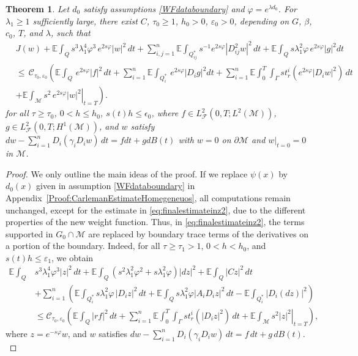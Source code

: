 \documentclass[11pt,oneside,leqno]{amsart}
\numberwithin{equation}{section}
\numberwithin{equation}{section}
\newcommand{\E}{\mathbb{E}}
\newtheorem{theorem}{Theorem}[section]
\begin{document}
{\begin{theorem}\label{theo:CarlemanDataboundary}
Let $d_0$ satisfy assumptions \ref{WFdataboundary} and $\varphi=e^{\lambda d_0}$. For $\lambda_1\geq 1$ sufficiently large, there exist $C$, $\tau_{0}\geq 1$, $h_{0}>0$, $\varepsilon_0 >0$, depending on $G$, $\beta$, $c_{0}$, $T$, and $\lambda$, such that 
\begin{equation}\label{eq:firstCarleman}
\begin{split}
&J(w)+\E\int_{Q}s^{3}\lambda^{4}_{1}\varphi^{3}\,e^{2s\varphi}|w|^{2}\,dt+\sum_{i,j=1}^{n}\E\int_{Q_{ij}^{\ast}}s^{-1}e^{2s\varphi}|D_{ij}^2w|^2\, dt+\E\int_{Q}s\lambda_{1}^2\varphi\,e^{2s\varphi}|g|^2dt\\
&\leq\,\mathcal{C}_{\tau_{0},\varepsilon_0}\left(\E\int_{Q}\,e^{2s\varphi}|f|^2\,dt+\sum_{i=1}^{n}\E\int_{Q_i^{\ast}}\,e^{2s\varphi}|D_{i}g|^2dt+\sum_{i=1}^{n}\E\int_0^T\int_{\Gamma}st_{r}^{i}(e^{2s\varphi}|D_iw|^2)\,dt\right.\\
&\left.+\left.\E\int_{\mathcal{M}}s^2\,e^{2s\varphi}|w|^2\right|_{t=T}\right).
\end{split}
\end{equation}
for all $\tau\geq \tau_0$, $0<h\leq h_0$, $s(t)h\leq \epsilon_0$, where $f\in L^{2}_{\mathcal{F}}(0,T;L^2(\mathcal{M}))$, $g\in L^{2}_{\mathcal{F}}(0,T;H^1(\mathcal{M}))$, and $w$ satisfy $\displaystyle dw-\sum_{i=1}^{n} D_i(\gamma_i D_{i}w)\,dt=fdt+gdB(t)$ with $w=0$ on $\partial \mathcal{M}$ and $w|_{t=0}=0$ in $\mathcal{M}$.
\end{theorem}
\begin{proof}
   We only outline the main ideas of the proof. If we replace $ \psi(x) $ by $ d_0(x)$ given in assumption \eqref{WFdataboundary} in Appendix~\ref{Proof:CarlemanEstimateHomegeneuos}, all computations remain unchanged, except for the estimate in \eqref{eq:finalestimateinz2}, due to the different properties of the new weight function. Thus, in \eqref{eq:finalestimateinz2}, the terms supported in $ G_0 \cap \mathcal{M} $ are replaced by boundary trace terms of the derivatives on a portion of the boundary. Indeed, for all $\tau\geq \tau_{1}>1$, $0<h<h_0$, and $s(t)h\le\varepsilon_1$, we obtain
\begin{equation}\label{eq1:carlemandatainterior}
\begin{aligned}
    \E\int_{Q}& s^{3}\lambda^{4}_{1}\varphi^{3}|z|^{2}\,dt+\E\int_{Q}(s^2\lambda_{1}^2\varphi^2+s\lambda_{1}^2\varphi)|dz|^2+\E\int_{Q}|Cz|^2\,dt\\
&+\sum_{i=1}^{n}\left(\E\int_{Q_{i}^{\ast}}s\lambda^{2}_{1}\varphi\,|D_{i}z|^{2}\,dt+\E\int_{Q} s\lambda_{1}^2\varphi|A_iD_iz|^2\,dt-\E\int_{Q_i^{\ast}}|D_i(dz)|^2\right)\\
&\leq\mathcal{C}_{\tau_{0},\varepsilon_0}\left(\E\int_{Q}|rf|^2\,dt+\sum_{i=1}^{n}\E\int_{0}^{T}\int_{\Gamma}st_{r}^{i}(|D_iz|^2)\,dt+\left.\E\int_{\mathcal{M}}s^2|z|^2\right|_{t=T}\right),
\end{aligned}
\end{equation}
where $z=e^{-s\varphi}w$, and $w$ satisfies $\displaystyle
dw-\sum_{i=1}^{n}D_i(\gamma_iD_iw)\,dt=f\,dt+g\,dB(t).$


\end{proof}}
\end{document}
